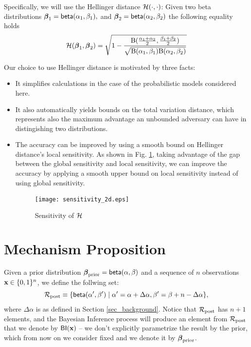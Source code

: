 \documentclass{article}
\begin{document}
Specifically, we will use the Hellinger distance $\mathcal{H}(\cdot,\cdot)$:
Given two beta distributions
$\boldsymbol{\beta}_1=\mathsf{beta}(\alpha_1, \beta_1),$ and $\boldsymbol{\beta}_2=\mathsf{beta}(\alpha_2, \beta_2)$ the following equality holds 
\[
  \mathcal{H}(\boldsymbol{\beta}_1, \boldsymbol{\beta}_2)=
  \sqrt{1 - \frac{\textup{B}(\frac{\alpha_1 + \alpha_2}{2}, \frac{\beta_1 + \beta_2}{2})}{\sqrt{\textup{B}(\alpha_1,\beta_1)\textup{B}(\alpha_2,\beta_2)}}}
\]

Our choice to use Hellinger distance is motivated by three facts:
\begin{itemize}
\item It simplifies calculations in the case of the probabilistic models considered here.
\item It also automatically yields bounds on the total variation distance, which represents also the maximum advantage
an unbounded adversary can have in distingishing two distributions. 
\item The accuracy can be improved by using a smooth bound on Hellinger distance's local sensitivity. As shown in Fig. \ref{fig_sensitivity}, taking advantage of the gap between the global sensitivity and local sensitivity, we can improve the accuracy by applying a smooth upper bound on local sensitivity instead of using global sensitivity.
\begin{figure}[ht]
\centering
\texttt{[image: sensitivity\_2d.eps]}
\caption{{Sensitivity of $\mathcal{H}$}}
\label{fig_sensitivity}
\end{figure}
\end{itemize}



\section{Mechanism Proposition}
\label{sec_mechs}
Given a prior distribution $\boldsymbol{\beta}_{\textup{prior}}=\mathsf{beta}(\alpha, \beta)$ and a sequence of $n$ observations $\textbf{x}\in\{0,1\}^n$, we define the follwing set:
\[
  \mathcal{R}_{\textup{post}}\equiv\{\mathsf{beta}(\alpha',\beta')\mid \alpha'=\alpha+\Delta\alpha, \beta'=\beta+n-\Delta\alpha\},
\]
where $\Delta\alpha$ is as defined in Section \ref{sec_background}.
Notice that $\mathcal{R}_{\textup{post}}$ has $n + 1$ elements, and
the Bayesian Inference process will produce an element from $\mathcal{R}_{\textup{post}}$
that we denote by $\mathsf{BI}(\textbf{x})$ -- we don't explicitly
parametrize the result by the prior, which from now on we consider
fixed and we denote it by $\boldsymbol{\beta}_{\textup{prior}}$.
\end{document}

